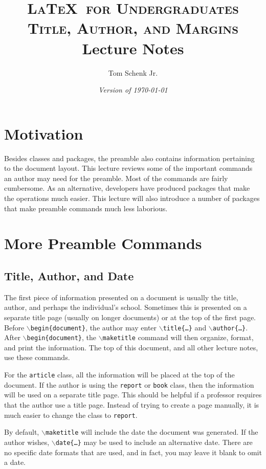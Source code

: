 \documentclass{article}
\title{\textsc{\LaTeX\ for Undergraduates\\
			Title, Author, and Margins} \\
			Lecture Notes}
\author{Tom Schenk Jr.}
\date{\textit{Version of \today}}
\begin{document}
\maketitle

\section{Motivation}

Besides classes and packages, the preamble also contains information pertaining to the document layout. This lecture reviews some of the important commands an author may need for the preamble. Most of the commands are fairly cumbersome. As an alternative, developers have produced packages that make the operations much easier. This lecture will also introduce a number of packages that make preamble commands much less laborious.

\section{More Preamble Commands}

\subsection{Title, Author, and Date}

The first piece of information presented on a document is usually the title, author, and perhaps the individual's school. Sometimes this is presented on a separate title page (usually on longer documents) or at the top of the first page. Before \texttt{$\backslash$begin\{document\}}, the author may enter \texttt{$\backslash$title\{\ldots\}} and \texttt{$\backslash$author\{\ldots\}}. After \texttt{$\backslash$begin\{document\}}, the \texttt{$\backslash$maketitle} command will then organize, format, and print the information. The top of this document, and all other lecture notes, use these commands.

For the \texttt{article} class, all the information will be placed at the top of the document. If the author is using the \texttt{report} or \texttt{book} class, then the information will be used on a separate title page. This should be helpful if a professor requires that the author use a title page. Instead of trying to create a page manually, it is much easier to change the class to \texttt{report}.

By default, \texttt{$\backslash$maketitle} will include the date the document was generated. If the author wishes, \texttt{$\backslash$date\{\ldots\}} may be used to include an alternative date. There are no specific date formats that are used, and in fact, you may leave it blank to omit a date. 
\end{document}
